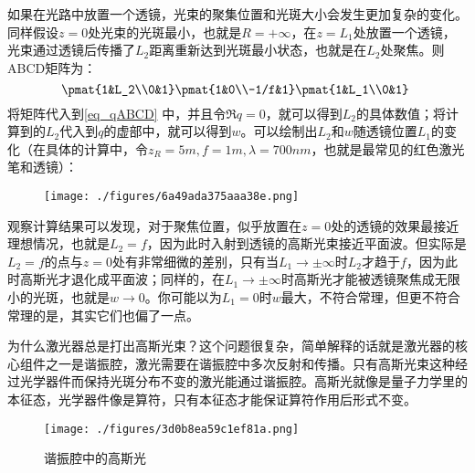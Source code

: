 如果在光路中放置一个透镜，光束的聚集位置和光斑大小会发生更加复杂的变化。同样假设$z=0$处光束的光斑最小，也就是$R=+\infty$，在$z=L_1$处放置一个透镜，光束通过透镜后传播了$L_2$距离重新达到光斑最小状态，也就是在$L_2$处聚焦。则ABCD矩阵为：
\begin{equation}
\pmat{1&L_2\\0&1}\pmat{1&0\\-1/f&1}\pmat{1&L_1\\0&1}~
\end{equation}
将矩阵代入到\autoref{eq_qABCD} 中，并且令$\Re{q}=0$，就可以得到$L_2$的具体数值；将计算到的$L_2$代入到$q$的虚部中，就可以得到$w$。可以绘制出$L_2$和$w$随透镜位置$L_1$的变化（在具体的计算中，令$z_R=5m,f=1m,\lambda=700nm$，也就是最常见的红色激光笔和透镜）：
\begin{figure}[ht]
\centering
\texttt{[image: ./figures/6a49ada375aaa38e.png]}
\caption{} \label{fig_GBeam_14}
\end{figure}
观察计算结果可以发现，对于聚焦位置，似乎放置在$z=0$处的透镜的效果最接近理想情况，也就是$L_2=f$，因为此时入射到透镜的高斯光束接近平面波。但实际是$L_2=f$的点与$z=0$处有非常细微的差别，只有当$L_1\to \pm\infty$时$L_2$才趋于$f$，因为此时高斯光才退化成平面波；同样的，在$L_1\to \pm\infty$时高斯光才能被透镜聚焦成无限小的光斑，也就是$w\to 0$。你可能以为$L_1=0$时$w$最大，不符合常理，但更不符合常理的是，其实它们也偏了一点。

\begin{example}{}
为什么激光器总是打出高斯光束？这个问题很复杂，简单解释的话就是激光器的核心组件之一是谐振腔，激光需要在谐振腔中多次反射和传播。只有高斯光束这种经过光学器件而保持光斑分布不变的激光能通过谐振腔。高斯光就像是量子力学里的本征态，光学器件像是算符，只有本征态才能保证算符作用后形式不变。

\begin{figure}[ht]
\centering
\texttt{[image: ./figures/3d0b8ea59c1ef81a.png]}
\caption{谐振腔中的高斯光} \label{fig_GBeam_15}
\end{figure}
\end{example}

